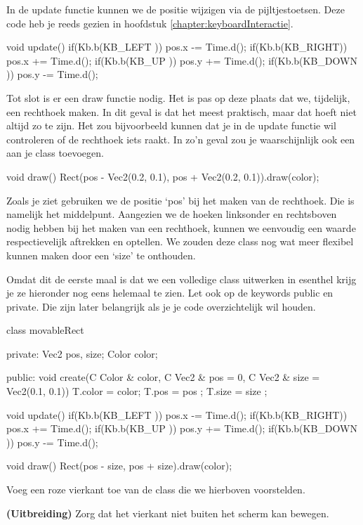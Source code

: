 In de update functie kunnen we de positie wijzigen via de pijltjestoetsen. Deze code heb je reeds gezien in hoofdstuk \ref{chapter:keyboardInteractie}.

\begin{code}
void update() {
	if(Kb.b(KB_LEFT )) pos.x -= Time.d();
	if(Kb.b(KB_RIGHT)) pos.x += Time.d();
	if(Kb.b(KB_UP   )) pos.y += Time.d();
	if(Kb.b(KB_DOWN )) pos.y -= Time.d();
}
\end{code}


Tot slot is er een draw functie nodig. Het is pas op deze plaats dat we, tijdelijk, een rechthoek maken. In dit geval is dat het meest praktisch, maar dat hoeft niet altijd zo te zijn. Het zou bijvoorbeeld kunnen dat je in de update functie wil controleren of de rechthoek iets raakt. In zo'n geval zou je waarschijnlijk ook een  aan je class toevoegen.

\begin{code}
void draw() {
  Rect(pos - Vec2(0.2, 0.1), pos + Vec2(0.2, 0.1)).draw(color);
}
\end{code}

Zoals je ziet gebruiken we de positie `pos' bij het maken van de rechthoek. Die is namelijk het middelpunt. Aangezien we de hoeken linksonder en rechtsboven nodig hebben bij het maken van een rechthoek, kunnen we eenvoudig een waarde respectievelijk aftrekken en optellen. We zouden deze class nog wat meer flexibel kunnen maken door een `size' te onthouden.

Omdat dit de eerste maal is dat we een volledige class uitwerken in esenthel krijg je ze hieronder nog eens helemaal te zien. Let ook op de keywords public en private. Die zijn later belangrijk als je je code overzichtelijk wil houden.

\begin{code}
class movableRect {
private:
  Vec2 pos, size;
	Color color;
	
public:
  void create(C Color & color, C Vec2 & pos = 0, C Vec2 & size = Vec2(0.1, 0.1)) {
	  T.color = color;
		T.pos   = pos  ;
		T.size  = size ;
	}
	
	void update() {
		if(Kb.b(KB_LEFT )) pos.x -= Time.d();
		if(Kb.b(KB_RIGHT)) pos.x += Time.d();
		if(Kb.b(KB_UP   )) pos.y += Time.d();
		if(Kb.b(KB_DOWN )) pos.y -= Time.d();
	}
	
	void draw() {
		Rect(pos - size, pos + size).draw(color);
	}
}
\end{code}

\begin{exercise}
Voeg een roze vierkant toe van de class  die we hierboven voorstelden.

\textbf{(Uitbreiding)} Zorg dat het vierkant niet buiten het scherm kan bewegen.
\end{exercise}

